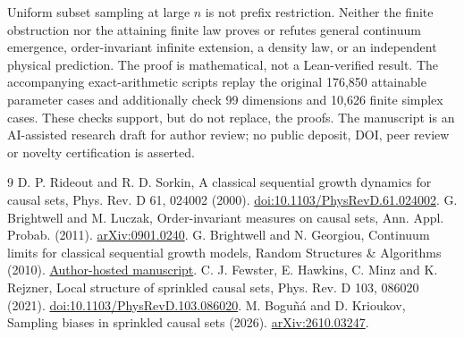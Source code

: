 \documentclass[11pt]{article}
\begin{document}
Uniform subset sampling at large $n$ is not prefix restriction. Neither the finite obstruction nor the attaining finite law proves or refutes general continuum emergence, order-invariant infinite extension, a density law, or an independent physical prediction. The proof is mathematical, not a Lean-verified result. The accompanying exact-arithmetic scripts replay the original 176,850 attainable parameter cases and additionally check 99 dimensions and 10,626 finite simplex cases. These checks support, but do not replace, the proofs. The manuscript is an AI-assisted research draft for author review; no public deposit, DOI, peer review or novelty certification is asserted.
\begin{thebibliography}{9}
 D. P. Rideout and R. D. Sorkin, A classical sequential growth dynamics for causal sets, Phys. Rev. D 61, 024002 (2000). \href{https://doi.org/10.1103/PhysRevD.61.024002}{doi:10.1103/PhysRevD.61.024002}.
 G. Brightwell and M. Luczak, Order-invariant measures on causal sets, Ann. Appl. Probab. (2011). \href{https://arxiv.org/abs/0901.0240}{arXiv:0901.0240}.
 G. Brightwell and N. Georgiou, Continuum limits for classical sequential growth models, Random Structures \& Algorithms (2010). \href{https://nicholasgeorgiou.webspace.durham.ac.uk/wp-content/uploads/sites/199/2021/04/contlim.pdf}{Author-hosted manuscript}.
 C. J. Fewster, E. Hawkins, C. Minz and K. Rejzner, Local structure of sprinkled causal sets, Phys. Rev. D 103, 086020 (2021). \href{https://doi.org/10.1103/PhysRevD.103.086020}{doi:10.1103/PhysRevD.103.086020}.
 M. Bogu\~n\'a and D. Krioukov, Sampling biases in sprinkled causal sets (2026). \href{https://arxiv.org/abs/2610.03247}{arXiv:2610.03247}.
\end{thebibliography}
\end{document}
